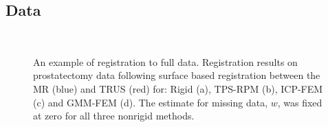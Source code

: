\documentclass[journal]{IEEEtran}
\begin{document}
\subsection{Data}\label{sec:data}
\begin{figure}
	\centering
	\\
    \caption{An example of registration to full data. Registration results on prostatectomy data following surface based registration between the MR (blue) and TRUS (red) for: Rigid (a), TPS-RPM (b), ICP-FEM (c) and GMM-FEM (d). The estimate for missing data, $w$, was fixed at zero for all three nonrigid methods. \label{fig:exp2fig1}}
\end{figure}
\end{document}
